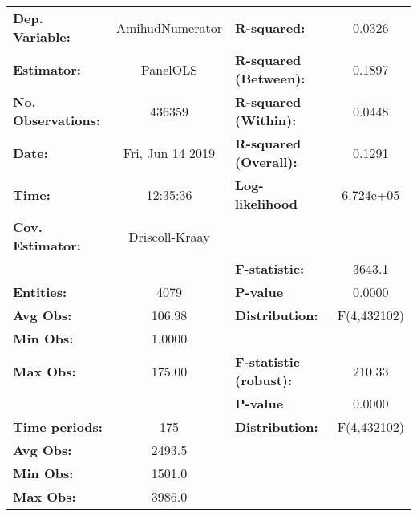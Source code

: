 \begin{center}
\begin{tabular}{lclc}
\toprule
\textbf{Dep. Variable:}                 &  AmihudNumerator   & \textbf{  R-squared:         }   &      0.0326      \\
\textbf{Estimator:}                     &      PanelOLS      & \textbf{  R-squared (Between):}  &      0.1897      \\
\textbf{No. Observations:}              &       436359       & \textbf{  R-squared (Within):}   &      0.0448      \\
\textbf{Date:}                          &  Fri, Jun 14 2019  & \textbf{  R-squared (Overall):}  &      0.1291      \\
\textbf{Time:}                          &      12:35:36      & \textbf{  Log-likelihood     }   &    6.724e+05     \\
\textbf{Cov. Estimator:}                &   Driscoll-Kraay   & \textbf{                     }   &                  \\
\textbf{}                               &                    & \textbf{  F-statistic:       }   &      3643.1      \\
\textbf{Entities:}                      &        4079        & \textbf{  P-value            }   &      0.0000      \\
\textbf{Avg Obs:}                       &       106.98       & \textbf{  Distribution:      }   &   F(4,432102)    \\
\textbf{Min Obs:}                       &       1.0000       & \textbf{                     }   &                  \\
\textbf{Max Obs:}                       &       175.00       & \textbf{  F-statistic (robust):} &      210.33      \\
\textbf{}                               &                    & \textbf{  P-value            }   &      0.0000      \\
\textbf{Time periods:}                  &        175         & \textbf{  Distribution:      }   &   F(4,432102)    \\
\textbf{Avg Obs:}                       &       2493.5       & \textbf{                     }   &                  \\
\textbf{Min Obs:}                       &       1501.0       & \textbf{                     }   &                  \\
\textbf{Max Obs:}                       &       3986.0       & \textbf{                     }   &                  \\

\end{tabular}
\end{center}
